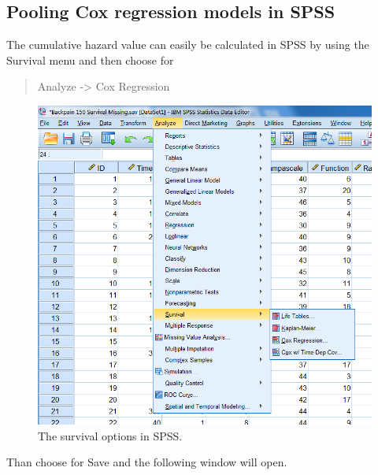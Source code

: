 \documentclass[]{book}
\theoremstyle{definition}
\theoremstyle{definition}
\theoremstyle{definition}
\theoremstyle{remark}
\begin{document}
\subsection{Pooling Cox regression models in
SPSS}\label{pooling-cox-regression-models-in-spss}

The cumulative hazard value can easily be calculated in SPSS by using
the Survival menu and then choose for

\begin{quote}
Analyze -\textgreater{} Cox Regression
\end{quote}

\begin{figure}

{\centering \includegraphics[width=0.9\linewidth]{images/fig5.5} 

}

\caption{The survival options in SPSS.}\label{fig:fig5-5}
\end{figure}

Than choose for Save and the following window will open.
\end{document}
